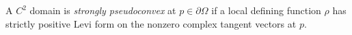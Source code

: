 
A $C^2$ domain is \emph{strongly pseudoconvex} at $p\in\partial\Omega$ if a local defining function $\rho$ has strictly positive Levi form on the nonzero complex tangent vectors at $p$.

